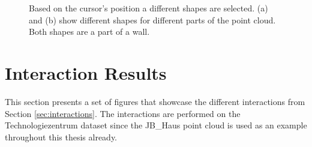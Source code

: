 \begin{figure}
\centering
{}
\caption[Two examples of user-guided shape detection]
{Based on the cursor's position a different shapes are selected. (a) and (b) show different shapes for different parts of the point cloud. Both shapes are a part of a wall. }
\label{fig:technologiezentrum_interactive_shape_detection}
\end{figure}


\section{Interaction Results}
\label{sec:interaction_results}

This section presents a set of figures that showcase the different interactions from Section \ref{sec:interactions}. The interactions are performed on the Technologiezentrum dataset since the JB\_Haus point cloud is used as an example throughout this thesis already. 

